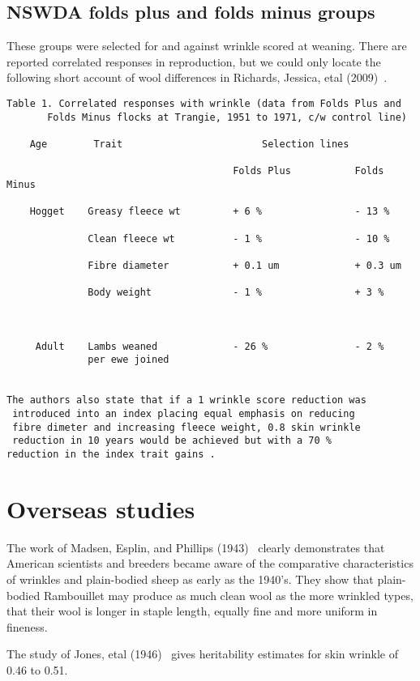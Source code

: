 \documentclass[titlepage]{article}  %
\begin{document}
\subsection{NSWDA folds plus and folds minus groups}
These groups were selected for and against wrinkle scored at weaning. There are reported correlated responses in reproduction, but we could only locate the following short account of wool differences in Richards, Jessica, etal (2009)~\cite{rich:09}.
\begin{verbatim}
Table 1. Correlated responses with wrinkle (data from Folds Plus and
       Folds Minus flocks at Trangie, 1951 to 1971, c/w control line)

    Age        Trait                        Selection lines

                                       Folds Plus           Folds Minus

    Hogget    Greasy fleece wt         + 6 %                - 13 %

              Clean fleece wt          - 1 %                - 10 %

              Fibre diameter           + 0.1 um             + 0.3 um

              Body weight              - 1 %                + 3 %

 

     Adult    Lambs weaned             - 26 %               - 2 %
              per ewe joined


The authors also state that if a 1 wrinkle score reduction was
 introduced into an index placing equal emphasis on reducing
 fibre dimeter and increasing fleece weight, 0.8 skin wrinkle
 reduction in 10 years would be achieved but with a 70 % 
reduction in the index trait gains .
\end{verbatim}

\section{Overseas studies}
The work of Madsen, Esplin, and Phillips (1943)~\cite{mads:43} clearly demonstrates that American scientists and breeders became aware of the comparative characteristics of wrinkles and plain-bodied sheep as early as the 1940's. They show that plain-bodied Rambouillet may produce as much clean wool as the more wrinkled types, that their wool is longer in staple length, equally fine and more uniform in fineness. 

The study of Jones, etal (1946)~\cite{jone:46} gives heritability estimates for skin wrinkle of 0.46 to 0.51. 
\end{document}
